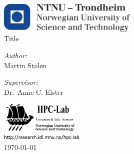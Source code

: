 \begin{titlepage}
\begin{center}

	\includegraphics[width=0.5\textwidth]{images/logo_ntnu_eng}~\\[1cm]

	{\huge Title}\\[1.5cm]

	\noindent
	\begin{minipage}{0.4\textwidth}
		\begin{flushleft}
		\emph{Author:}\\
		Martin Stølen
		\end{flushleft}
	\end{minipage}
	\begin{minipage}{0.4\textwidth}
		\begin{flushright}
		\emph{Supervisor:}\\
		Dr.~Anne C. Elster
		\end{flushright}
	\end{minipage}

	\vfill
	\includegraphics[width=0.3\textwidth]{images/hpc-lab-no-ntnu-logo}~\\[0.5cm]
	{\today}

\end{center}
\end{titlepage}
